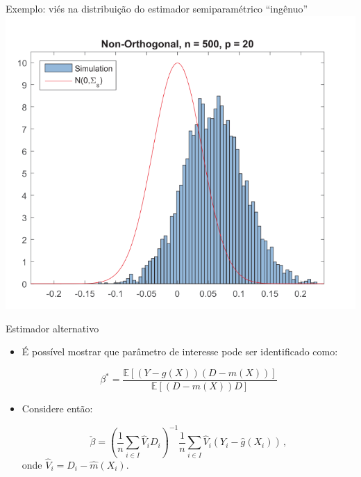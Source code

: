 \documentclass[11pt]{beamer}
\begin{document}
	\begin{frame}{Exemplo: viés  na distribuição do estimador semiparamétrico ``ingênuo''}
	\centering
	\includegraphics[scale=0.5]{graficos/naive.png}
	\end{frame}
	\begin{frame}{Estimador alternativo}
		\begin{itemize}
			\item É possível mostrar que parâmetro de interesse pode ser identificado como:
			
			$$\beta^*  =  \frac{\mathbb{E}[(Y - g(X))(D-m(X)) ]}{\mathbb{E}[(D-m(X))D]}$$
			\item Considere então:
			
			$$\check{\beta}=\left(\frac{1}{n} \sum_{i \in I} \hat{V}_{i} D_{i}\right)^{-1} \frac{1}{n} \sum_{i \in I} \hat{V}_{i}\left(Y_{i}-\hat{g}\left(X_{i}\right)\right)\,, $$
			onde $\hat{V}_i = D_i - \hat{m}(X_i)$.

			
		\end{itemize}
	\end{frame}
\end{document}
